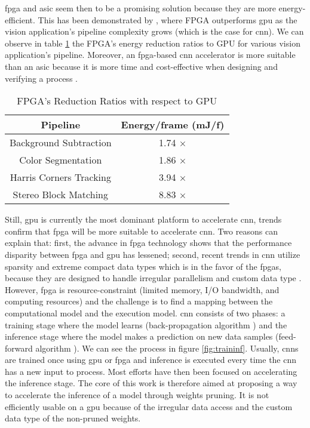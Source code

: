 \acrshort{fpga} and \acrshort{asic} seem then to be a promising solution because they are more energy-efficient. This has been demonstrated by \textcite{qasaimeh_comparing_2019}, where FPGA outperforms \acrshort{gpu} as the vision application’s pipeline complexity grows (which is the case for \acrshort{cnn}). We can observe in table \ref{tab:benchener} the FPGA’s energy reduction ratios to GPU for various vision application’s pipeline. Moreover, an \acrshort{fpga}-based \acrshort{cnn} accelerator is more suitable than an \acrshort{asic} because it is more time and cost-effective when designing and verifying a process \cite{motamedi_placid_2017}.
\begin{table}
    \center
    \begin{tabular}{|c|c|}
        \hline
        Pipeline & Energy/frame (mJ/f) \\
        \hline
        Background Subtraction & 1.74 $\times$\\
        \hline
        Color Segmentation & 1.86 $\times$ \\
        \hline
        Harris Corners Tracking & 3.94 $\times$ \\
        \hline
        Stereo Block Matching & 8.83 $\times$ \\
        \hline
    \end{tabular}
    \caption{FPGA’s Reduction Ratios with respect to GPU \cite{qasaimeh_comparing_2019}}
    \label{tab:benchener}
\end{table} \newline \newline
%
Still, \acrshort{gpu} is currently the most dominant platform to accelerate \acrshort{cnn}, trends confirm that \acrshort{fpga} will be more suitable to accelerate \acrshort{cnn}. Two reasons can explain that: first, the advance in \acrshort{fpga} technology shows that the performance disparity between \acrshort{fpga} and \acrshort{gpu} has lessened; second, recent trends in \acrshort{cnn} utilize sparsity and extreme compact data types which is in the favor of the \acrshort{fpga}s, because they are designed to handle irregular parallelism and custom data type \cite{nurvitadhi_can_2017}. However, \acrshort{fpga} is resource-constraint (limited memory, I/O bandwidth, and computing resources) and the challenge is to find a mapping between the computational model and the execution model. \newline \newline
%
\acrshort{cnn} consists of two phases: a training stage where the model learns (back-propagation algorithm \cite{lecun_backpropagation_1989}) and the inference stage where the model makes a prediction on new data samples (feed-forward algorithm \cite{zhang_optimizing_2015}). We can see the process in figure \ref{fig:traininf}. Usually, \acrshort{cnn}s are trained once using \acrshort{gpu} or \acrshort{fpga} and inference is executed every time the \acrshort{cnn} has a new input to process. Most efforts have then been focused on accelerating the inference stage. The core of this work is therefore aimed at proposing a way to accelerate the inference of a model through weights pruning. It is not efficiently usable on a \acrshort{gpu} because of the irregular data access and the custom data type of the non-pruned weights.
